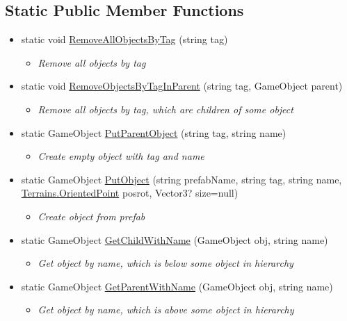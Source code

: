 \subsection*{Static Public Member Functions}
\begin{itemize}
\item[]  
static void \mbox{\hyperlink{classRacingGameBot_1_1Utils_1_1Objects_a470212c434547aac475e2c8ee7c3bd16}{RemoveAllObjectsByTag}} (string tag)
\begin{itemize}\small\item[] \em Remove all objects by tag \end{itemize}\item[]  
static void \mbox{\hyperlink{classRacingGameBot_1_1Utils_1_1Objects_a2e56cd57a6819402d4b42e29de16412c}{RemoveObjectsByTagInParent}} (string tag, GameObject parent)
\begin{itemize}\small\item[] \em Remove all objects by tag, which are children of some object \end{itemize}\item[]  
static GameObject \mbox{\hyperlink{classRacingGameBot_1_1Utils_1_1Objects_a36bff4d237ccd98b36573ed7872114f1}{PutParentObject}} (string tag, string name)
\begin{itemize}\small\item[] \em Create empty object with tag and name \end{itemize}\item[]  
static GameObject \mbox{\hyperlink{classRacingGameBot_1_1Utils_1_1Objects_a3800d0d8c3c7402ca0af07a08eed961b}{PutObject}} (string prefabName, string tag, string name, \mbox{\hyperlink{classRacingGameBot_1_1Terrains_1_1OrientedPoint}{Terrains.OrientedPoint}} posrot, Vector3? size=null)
\begin{itemize}\small\item[] \em Create object from prefab \end{itemize}\item[]  
static GameObject \mbox{\hyperlink{classRacingGameBot_1_1Utils_1_1Objects_ac23bb5d0f9d68c4196af65e54a83812f}{GetChildWithName}} (GameObject obj, string name)
\begin{itemize}\small\item[] \em Get object by name, which is below some object in hierarchy \end{itemize}\item[]  
static GameObject \mbox{\hyperlink{classRacingGameBot_1_1Utils_1_1Objects_aa55012d594fc94816076dfe15f2b9111}{GetParentWithName}} (GameObject obj, string name)
\begin{itemize}\small\item[] \em Get object by name, which is above some object in hierarchy \end{itemize}\end{itemize}


